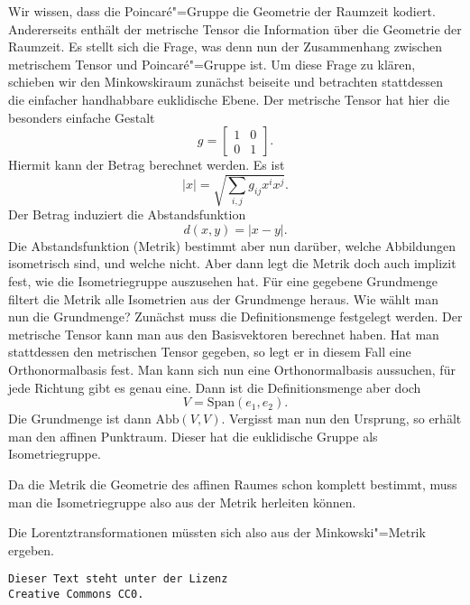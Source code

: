 \documentclass[a4paper,11pt,fleqn,twocolumn,twoside]{scrartcl}
\begin{document}
Wir wissen, dass die Poincaré"=Gruppe die Geometrie der Raumzeit
kodiert. Andererseits enthält der metrische Tensor die Information
über die Geometrie der Raumzeit. Es stellt sich die Frage, was denn
nun der Zusammenhang zwischen metrischem Tensor und Poincaré"=Gruppe
ist. Um diese Frage zu klären, schieben wir den Minkowskiraum zunächst
beiseite und betrachten stattdessen die einfacher handhabbare
euklidische Ebene. Der metrische Tensor hat hier die besonders
einfache Gestalt%
\[g=\begin{bmatrix}
1 & 0\\
0 & 1
\end{bmatrix}.\]
Hiermit kann der Betrag berechnet werden. Es ist%
\[|x| = \sqrt{\sum_{i,j}g_{ij}x^ix^j}.\]
Der Betrag induziert die Abstandsfunktion%
\[d(x,y) = |x-y|.\]
Die Abstandsfunktion (Metrik) bestimmt aber nun darüber, welche
Abbildungen isometrisch sind, und welche nicht. Aber dann legt die
Metrik doch auch implizit fest, wie die Isometriegruppe auszusehen hat.
Für eine gegebene Grundmenge filtert die Metrik alle Isometrien aus
der Grundmenge heraus. Wie wählt man nun die Grundmenge? Zunächst muss
die Definitionsmenge festgelegt werden. Der metrische Tensor kann man
aus den Basisvektoren berechnet haben. Hat man stattdessen den
metrischen Tensor gegeben, so legt er in diesem Fall eine
Orthonormalbasis fest. Man kann sich nun eine Orthonormalbasis
aussuchen, für jede Richtung gibt es genau eine. Dann ist die
Definitionsmenge aber doch%
\[V = \mathrm{Span}(e_1,e_2).\]
Die Grundmenge ist dann $\mathrm{Abb}(V,V)$. Vergisst man nun den
Ursprung, so erhält man den affinen Punktraum. Dieser hat die
euklidische Gruppe als Isometriegruppe.

Da die Metrik die Geometrie des affinen Raumes schon komplett bestimmt,
muss man die Isometriegruppe also aus der Metrik herleiten können.

Die Lorentztransformationen müssten sich also aus der Minkowski"=Metrik
ergeben.

\vfill\noindent
\texttt{Dieser Text steht unter der Lizenz\\
Creative Commons CC0.}
\end{document}
